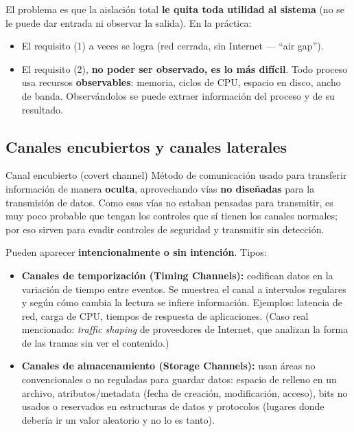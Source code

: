 \documentclass[../main.tex]{subfiles}
\begin{document}

El problema es que la aislación total \textbf{le quita toda utilidad al sistema}
(no se le puede dar entrada ni observar la salida). En la práctica:
\begin{itemize}[noitemsep]
  \item El requisito (1) a veces se logra (red cerrada, sin Internet --- ``air gap'').
  \item El requisito (2), \textbf{no poder ser observado, es lo más difícil}.
        Todo proceso usa recursos \textbf{observables}: memoria, ciclos de CPU,
        espacio en disco, ancho de banda. Observándolos se puede extraer información
        del proceso y de su resultado.
\end{itemize}

\subsection{Canales encubiertos y canales laterales}

\begin{definicion}{Canal encubierto (covert channel)}
Método de comunicación usado para transferir información de manera \textbf{oculta},
aprovechando vías \textbf{no diseñadas} para la transmisión de datos. Como esas
vías no estaban pensadas para transmitir, es muy poco probable que tengan los
controles que sí tienen los canales normales; por eso sirven para evadir
controles de seguridad y transmitir sin detección.
\end{definicion}

Pueden aparecer \textbf{intencionalmente o sin intención}. Tipos:

\begin{itemize}
  \item \textbf{Canales de temporización (Timing Channels):} codifican datos en
        la variación de tiempo entre eventos. Se muestrea el canal a intervalos
        regulares y según cómo cambia la lectura se infiere información. Ejemplos:
        latencia de red, carga de CPU, tiempos de respuesta de aplicaciones.
        (Caso real mencionado: \textit{traffic shaping} de proveedores de Internet,
        que analizan la forma de las tramas sin ver el contenido.)
  \item \textbf{Canales de almacenamiento (Storage Channels):} usan áreas no
        convencionales o no reguladas para guardar datos: espacio de relleno en un
        archivo, atributos/metadata (fecha de creación, modificación, acceso),
        bits no usados o reservados en estructuras de datos y protocolos (lugares
        donde debería ir un valor aleatorio y no lo es tanto).
\end{itemize}
\end{document}
